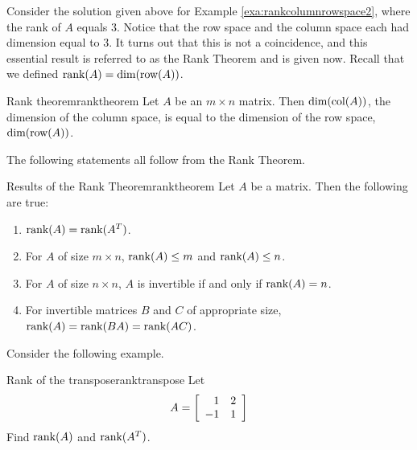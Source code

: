 Consider the solution given above for Example
\ref{exa:rankcolumnrowspace2}, where the rank of $A$ equals
$3$. Notice that the row space and the column space each had dimension
equal to $3$. It turns out that this is not a coincidence, and this
essential result is referred to as the Rank Theorem and is given
now. Recall that we defined $\mbox{rank}(A) = \mbox{dim}(\mbox{row}(A))$. 

\begin{theorem}{Rank theorem}{ranktheorem}
Let $A$ be an $m \times n$ matrix. Then $\mbox{dim}(\mbox{col} (A))$, the dimension of the column space, is equal to the dimension of the row space, $\mbox{dim}(\mbox{row}(A))$.
\end{theorem}

The following statements all follow from the Rank Theorem.

\begin{corollary}{Results of the Rank Theorem}{ranktheorem}
Let $A$ be a matrix. Then the following are true:
\begin{enumerate}
\item
 $\mbox{rank}(A) = \mbox{rank}(A^T)$.
\item
For $A$ of size $m \times n$, $\mbox{rank}(A) \leq m$ and $\mbox{rank}(A) \leq n$.
\item
For $A$ of size $n \times n$,  $A$ is invertible if and only if $\mbox{rank}(A) = n$.
\item
For invertible matrices $B$ and $C$ of appropriate size, 
$\mbox{rank}(A) = \mbox{rank}(BA) = \mbox{rank}(AC)$. 
\end{enumerate}
\end{corollary}

Consider the following example.

\begin{example}{Rank of the transpose}{ranktranspose}
Let \[
A = 
\left[
\begin{array}{rr}
1 & 2 \\
-1 & 1 
\end{array} \right]
\]
Find $\mbox{rank}(A)$ and $\mbox{rank}(A^T)$.
\end{example}

